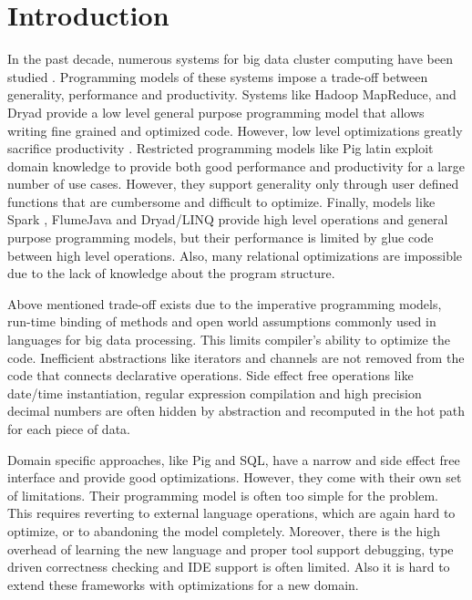\section{Introduction}
\label{sec:introduction}

In the past decade, numerous systems for big data cluster computing have been studied \cite{dean_mapreduce:_2008, yu_dryadlinq:_2008-1, olston_pig_2008-1, thusoo_hive_2010-1, spark-nsdi}. Programming models of these systems impose a trade-off between generality, performance and productivity. Systems like Hadoop MapReduce, \cite{hadoop} and Dryad \cite{isard_dryad:_2007} provide a low level general purpose programming model that allows writing fine grained and optimized code. However, low level optimizations greatly sacrifice productivity \cite{chambers_flumejava:_2010}. Restricted programming models like Pig latin \cite{olston_pig_2008-1} exploit domain knowledge to provide both good performance and productivity for a large number of use cases. However, they support generality only through user defined functions that are cumbersome and difficult to optimize. Finally, models like Spark \cite{spark-nsdi}, FlumeJava \cite{chambers_flumejava:_2010} and Dryad/LINQ \cite{yu_dryadlinq:_2008-1} provide high level operations and general purpose programming models, but their performance is limited by glue code between high level operations. Also, many relational optimizations are impossible due to the lack of knowledge about the program structure. 

Above mentioned trade-off exists due to the imperative programming models, run-time binding of methods and open world assumptions commonly used in languages for big data processing. This limits compiler's ability to optimize the code. Inefficient abstractions like iterators and channels are not removed from the code that connects declarative operations. Side effect free operations like date/time instantiation, regular expression compilation and high precision decimal numbers are often hidden by abstraction and recomputed in the hot path for each piece of data. 

Domain specific approaches, like Pig and SQL, have a narrow and side effect free interface and provide good optimizations. However, they come with their own set of limitations. Their programming model is often too simple for the problem. This requires reverting to external language operations, which are again hard to optimize, or to abandoning the model completely. Moreover, there is the high overhead of learning the new language and proper tool support debugging, type driven correctness checking and IDE support is often limited. Also it is hard to extend these frameworks with optimizations for a new domain.

